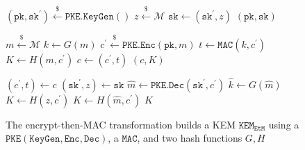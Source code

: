 \documentclass[journal=tches,submission]{iacrtrans}
\newcommand{\pke}{\texttt{PKE}}
\newcommand{\keygen}{\texttt{KeyGen}}
\newcommand{\encrypt}{\texttt{Enc}}
\newcommand{\decrypt}{\texttt{Dec}}
\newcommand{\kem}{\texttt{KEM}}
\newcommand{\encap}{\texttt{Encap}}
\newcommand{\decap}{\texttt{Decap}}
\newcommand{\etm}{\texttt{EtM}}  %
\newcommand{\mac}{\texttt{MAC}}
\newcommand{\pk}{\texttt{pk}}
\newcommand{\sk}{\texttt{sk}}
\newcommand{\leftsample}{\stackrel{\$}{\leftarrow}}
\begin{document}
\begin{figure}[h]
    \centering
    \begin{minipage}[t]{0.5\textwidth}
        \begin{algorithm}[H]
            \caption*{$\kem_\etm.\keygen()$}
            \begin{algorithmic}[1]
                \State $(\pk, \sk^\prime) \leftsample \pke\texttt{.}\keygen()$
                \State $z \leftsample \mathcal{M}$
                \State $\sk \leftarrow (\sk^\prime, z)$
                \State \Return $(\pk, \sk)$
            \end{algorithmic}
        \end{algorithm}
        \begin{algorithm}[H]
            \caption*{$\kem_\etm.\encap(\pk)$}
            \begin{algorithmic}[1]
                \State $m \leftsample \mathcal{M}$
                \State $k \leftarrow G(m)$
                \State $c^\prime \leftsample \pke\texttt{.}\encrypt(\pk, m)$
                \State $t \leftarrow \mac(k, c^\prime)$
                \State $K \leftarrow H(m, c^\prime)$
                \State $c \leftarrow (c^\prime, t)$
                \State \Return $(c, K)$
            \end{algorithmic}
        \end{algorithm}
    \end{minipage}\hfill
    \begin{minipage}[t]{0.49\textwidth}
        \begin{algorithm}[H]
            \caption*{$\kem_\etm.\decap(\sk, c)$}
            \begin{algorithmic}[1]
                \State $(c^\prime, t) \leftarrow c$
                \State $(\sk^\prime, z) \leftarrow \sk$
                \State $\hat{m} \leftarrow \pke\texttt{.}\decrypt(\sk^\prime, c^\prime)$
                \State $\hat{k} \leftarrow G(\hat{m})$
                \If{$\mac(\hat{k}, c^\prime) \neq t$}
                    \State $K \leftarrow H(z, c^\prime)$
                \Else
                    \State $K \leftarrow H(\hat{m}, c^\prime)$
                \EndIf
                \State \Return $K$
            \end{algorithmic}
        \end{algorithm}
    \end{minipage}
    \caption{The encrypt-then-MAC transformation builds a KEM $\kem_\etm$ using a $\pke(\keygen, \encrypt, \decrypt)$, a $\mac$, and two hash functions $G, H$}\label{fig:etm-routines} 
\end{figure}
\end{document}
